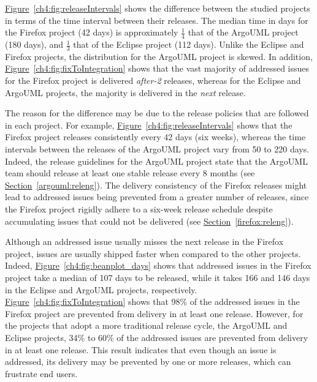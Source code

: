 \noindent{}
\hyperref[ch4:fig:releaseIntervals]{Figure}~\ref{ch4:fig:releaseIntervals} shows the
difference between the studied projects in terms of the time interval between
their releases. The median time in days for the Firefox project (42 days) is
approximately $\frac{1}{4}$ that of the ArgoUML project (180 days), and
$\frac{1}{3}$ that of the Eclipse project (112 days). Unlike the Eclipse and
Firefox projects, the distribution for the ArgoUML project is skewed. In
addition, \hyperref[ch4:fig:fixToIntegration]{Figure}~\ref{ch4:fig:fixToIntegration}
shows that the vast majority of addressed issues for the Firefox project is
delivered
\textit{after-2} releases, whereas for the Eclipse and ArgoUML projects, the
majority is delivered in the \textit{next} release. 

The reason for the difference may be due to the release policies that are
followed in each project. For example,
\hyperref[ch4:fig:releaseIntervals]{Figure}~\ref{ch4:fig:releaseIntervals} shows that
the Firefox project releases consistently every 42 days (six weeks), whereas the
time intervals between the releases of the ArgoUML project vary from 50 to 220
days. Indeed, the release guidelines for the ArgoUML project state that the
ArgoUML team should release at least one stable release every 8 months (see
\hyperref[argouml:releng]{Section}~\ref{argouml:releng}). The delivery
consistency of the Firefox releases might lead to addressed issues being prevented
from a greater number of releases, since the Firefox project rigidly adhere to a
six-week release schedule despite accumulating issues that could not be
delivered (see \hyperref[firefox:releng]{Section}~\ref{firefox:releng}). 

Although an addressed issue usually misses the next release in the Firefox
project, issues are usually shipped faster when compared to the other projects.
Indeed, \hyperref[ch4:fig:beanplot_days]{Figure}~\ref{ch4:fig:beanplot_days} shows that
addressed issues in the Firefox project take a median of 107 days to be
released, while it takes 166 and 146 days in the Eclipse and ArgoUML projects,
respectively.\\

\noindent{}
\hyperref[ch4:fig:fixToIntegration]{Figure}~\ref{ch4:fig:fixToIntegration} shows
that 98\% of the addressed issues in the Firefox project are prevented from
delivery in at least one release. However, for the projects that adopt a more
traditional release cycle, \ie the ArgoUML and Eclipse projects, 34\% to 60\%
of the addressed issues are prevented from delivery in at least one release.
This result indicates that even though an issue is addressed, its delivery may be
prevented by one or more releases, which can frustrate end users.\\

